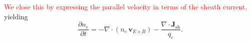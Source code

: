 \documentclass[12pt]{article}
\begin{document}
\textcolor{red}{We close this by expressing the parallel velocity in terms of the sheath current,} yielding
%
\begin{equation}
    \frac{\partial n_e}{\partial t} = - \nabla \cdot (n_e \, \bm{v}_{E \times B}) - \frac{\nabla \cdot \bm{J}_\text{sh}}{q_e} .
\end{equation}



\end{document}
